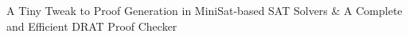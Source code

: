A Tiny Tweak to Proof Generation in MiniSat-based SAT Solvers
\&
A Complete and Efficient DRAT Proof Checker
